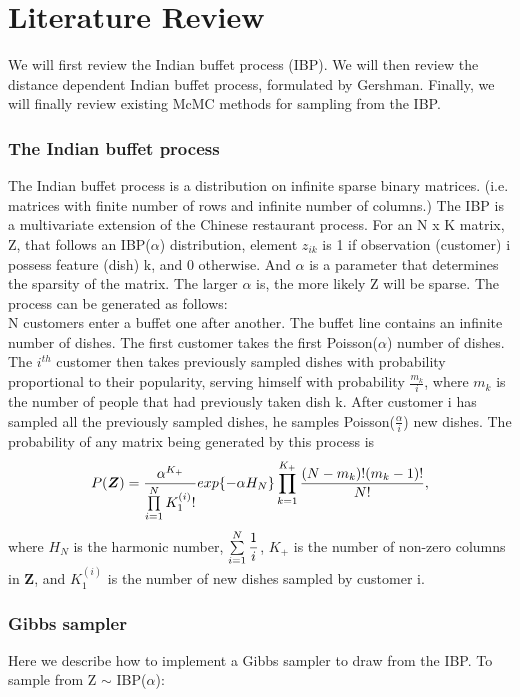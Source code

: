 
\chapter{Literature Review} %
We will first review the Indian buffet process (IBP). We will then review the 
distance dependent Indian buffet process, formulated by Gershman. %
Finally, we will finally review existing McMC methods for sampling from the IBP.

\subsection{The Indian buffet process}
The Indian buffet process is a distribution on infinite sparse binary matrices.
(i.e. matrices with finite number of rows and infinite number of columns.) The
IBP is a multivariate extension of the Chinese restaurant process. For an N x K
matrix, Z, that follows an IBP($\alpha$) distribution, element $z_{ik}$ is 1 if
observation (customer) i possess feature (dish) k, and 0 otherwise.  And
$\alpha$ is a parameter that determines the sparsity of the matrix. The larger
$\alpha$ is, the more likely Z will be sparse. The process can be generated as
follows: \\

\noindent
N customers enter a buffet one after another. The buffet line contains an
infinite number of dishes. The first customer takes the first Poisson($\alpha$)
number of dishes. The $i^{th}$ customer then takes previously sampled dishes
with probability proportional to their popularity, serving himself with
probability $\frac{m_k}{i}$, where $m_k$ is the number of people that had
previously taken dish k. After customer i has sampled all the previously sampled
dishes, he samples Poisson($\frac{\alpha}{i}$) new dishes. The probability of 
any matrix being generated by this process is
\begin{equation}
  P(\bm{Z}) = \frac{\alpha^{K_+}}{\prod\limits_{i=1}^{N} K_1^{(i)}!} 
              exp\{-\alpha H_N\}\prod\limits_{k=1}^{K_+}
              \frac{(N-m_k)!(m_k-1)!}{N!},
\end{equation}
where $H_N$ is the harmonic number, $\sum\limits_{i=1}^{N}\displaystyle\frac{1}{i}$, $K_+$ is the 
number of non-zero columns in $\bm Z$, and $K_1^{(i)}$ is the number of new dishes
sampled by customer i. %

\subsection{Gibbs sampler}
Here we describe how to implement a Gibbs sampler to draw from the IBP. 
To sample from Z $\sim$ IBP($\alpha$):

